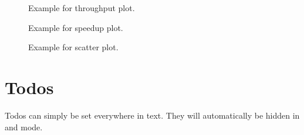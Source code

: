 \begin{figure}[t]
  \centering
  
  \caption{Example for throughput plot.}
  \label{fig:throughput}
\end{figure}

\begin{figure}[t]
  \centering
  
  \caption{Example for speedup plot.}
  \label{fig:speedup}
\end{figure}

\begin{figure}[t]
  \centering
  
  \caption{Example for scatter plot.}
  \label{fig:scatter}
\end{figure}

\section{Todos}
Todos can simply be set everywhere in text. They will
automatically be hidden in  and  mode.


